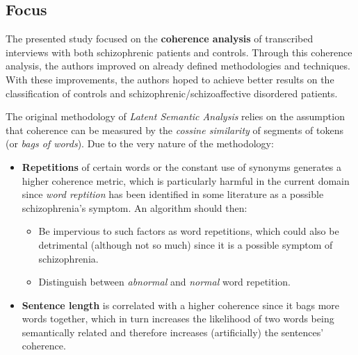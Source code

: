 \documentclass{Paper_Summary}
\begin{document}
\makepapertitle

\breakline

\begin{center}
    \section*{Focus}
\end{center}

    The presented study focused on the \textbf{coherence analysis} of transcribed interviews with both schizophrenic patients and controls. Through this coherence analysis, the authors improved on already defined methodologies and techniques. With these improvements, the authors hoped to achieve better results on the classification of controls and schizophrenic/schizoaffective disordered patients.

    The original methodology of \emph{Latent Semantic Analysis} relies on the assumption that coherence can be measured by the \emph{cossine similarity} of segments of tokens (or \emph{bags of words}). Due to the very nature of the methodology:
    \begin{itemize}
        \item \textbf{Repetitions} of certain words or the constant use of synonyms generates a higher coherence metric, which is particularly harmful in the current domain since \emph{word reptition} has been identified in some literature as a possible schizophrenia's symptom. An algorithm should then:
        \begin{itemize}
            \item Be impervious to such factors as word repetitions, which could also be detrimental (although not so much) since it is a possible symptom of schizophrenia.
            \item Distinguish between \emph{abnormal} and \emph{normal} word repetition.
        \end{itemize} 
        \item \textbf{Sentence length} is correlated with a higher coherence since it bags more words together, which in turn increases the likelihood of two words being semantically related and therefore increases (artificially) the sentences' coherence.
    \end{itemize}
\end{document}
